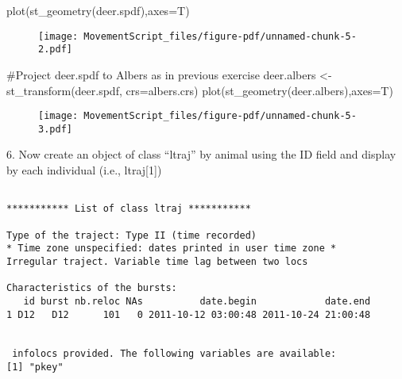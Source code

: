 \documentclass[
  letterpaper,
]{book}
\newenvironment{Shaded}{\begin{snugshade}}{\end{snugshade}}
\newcommand{\AttributeTok}[1]{\textcolor[rgb]{0.40,0.45,0.13}{#1}}
\newcommand{\CommentTok}[1]{\textcolor[rgb]{0.37,0.37,0.37}{#1}}
\newcommand{\DecValTok}[1]{\textcolor[rgb]{0.68,0.00,0.00}{#1}}
\newcommand{\FunctionTok}[1]{\textcolor[rgb]{0.28,0.35,0.67}{#1}}
\newcommand{\NormalTok}[1]{\textcolor[rgb]{0.00,0.23,0.31}{#1}}
\newcommand{\OtherTok}[1]{\textcolor[rgb]{0.00,0.23,0.31}{#1}}
\newcommand{\SpecialCharTok}[1]{\textcolor[rgb]{0.37,0.37,0.37}{#1}}
\begin{document}
\begin{Shaded}
\begin{Highlighting}[]
\FunctionTok{plot}\NormalTok{(}\FunctionTok{st\_geometry}\NormalTok{(deer.spdf),}\AttributeTok{axes=}\NormalTok{T)}
\end{Highlighting}
\end{Shaded}

\begin{figure}[H]

{\centering \texttt{[image: MovementScript\_files/figure-pdf/unnamed-chunk-5-2.pdf]}

}

\end{figure}

\begin{Shaded}
\begin{Highlighting}[]
\CommentTok{\#Project deer.spdf to Albers as in previous exercise}
\NormalTok{deer.albers }\OtherTok{\textless{}{-}}\FunctionTok{st\_transform}\NormalTok{(deer.spdf, }\AttributeTok{crs=}\NormalTok{albers.crs)}
\FunctionTok{plot}\NormalTok{(}\FunctionTok{st\_geometry}\NormalTok{(deer.albers),}\AttributeTok{axes=}\NormalTok{T)}
\end{Highlighting}
\end{Shaded}

\begin{figure}[H]

{\centering \texttt{[image: MovementScript\_files/figure-pdf/unnamed-chunk-5-3.pdf]}

}

\end{figure}

6. Now create an object of class ``ltraj'' by animal using the ID field
and display by each individual (i.e., ltraj{[}1{]})

\begin{Shaded}
\end{Shaded}

\begin{verbatim}

*********** List of class ltraj ***********

Type of the traject: Type II (time recorded)
* Time zone unspecified: dates printed in user time zone *
Irregular traject. Variable time lag between two locs

Characteristics of the bursts:
   id burst nb.reloc NAs          date.begin            date.end
1 D12   D12      101   0 2011-10-12 03:00:48 2011-10-24 21:00:48


 infolocs provided. The following variables are available:
[1] "pkey"
\end{verbatim}
\end{document}
